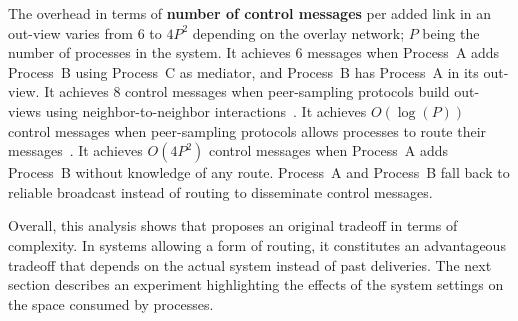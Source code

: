 \noindent The overhead in terms of \textbf{number of control messages} per added
link in an out-view varies from $6$ to $4P^2$ depending on the overlay network;
$P$ being the number of processes in the system. It achieves $6$ messages when
Process~A adds Process~B using Process~C as mediator, and Process~B has
Process~A in its out-view.  It achieves $8$ control messages when peer-sampling
protocols build out-views using neighbor-to-neighbor
interactions~\cite{jelasity2007gossip,nedelec2017adaptive}. It achieves
$O(\log(P))$ control messages when peer-sampling protocols allows processes to
route their messages~\cite{jelasity2009tman,stoica2001chord}.  It achieves
$O(4P^2)$ control messages when Process~A adds Process~B without knowledge of
any route. Process~A and Process~B fall back to reliable broadcast instead of
routing to disseminate control messages.

Overall, this analysis shows that \RPCBROADCAST proposes an original tradeoff in
terms of complexity. In systems allowing a form of routing, it constitutes an
advantageous tradeoff that depends on the actual system instead of past
deliveries. The next section describes an experiment highlighting the effects of
the system settings on the space consumed by processes.

